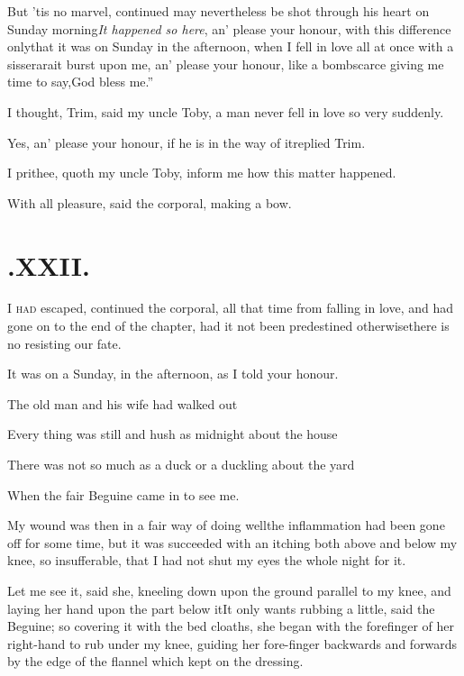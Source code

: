 \documentclass{article}
\begin{document}
\quad\tsh But ’tis no marvel, continued\break 
{}
\tsk may nevertheless be shot
through his heart on Sunday morning\tsh \textit{It
happened so here}, an’ please your honour, with this
difference only\tsk that it was on Sunday in the afternoon, when I fell in love all
at once with a sisserara\tsh it burst upon me, an’
please your honour, like a bomb\tsh scarce giving me time
to say,\break\lqq God bless me.”

I thought, Trim, said my uncle\break
Toby, a man never fell in love so very\break
suddenly.

Yes, an’ please your honour, if\break
he is in the way of it\tsh replied\break
Trim.

I prithee, quoth my uncle Toby,\break
inform me how this matter happened.

\tsh With all pleasure, said the corporal, making a
bow.

\vfill{}\eject\null
\section{.\enspace XXII.}

\lettrine{I}{ had} escaped, continued the
corporal, all that time from falling in love, and had gone on to
the end of the chapter, had it not been predestined
otherwise\tsh\break there is no resisting our fate.

It was on a Sunday, in the afternoon, as I told your
honour.

The old man and his wife had walked
out\tsh

Every thing was still and hush as midnight about the
house\tsh

There was not so much as a duck or a duckling about the
yard\tsh{}

\tsh When the fair Beguine came in to see
me.

My wound was then in a fair way of doing well\tsh the
inflammation had been gone off for some time, but it was succeeded
with an itching both above and below my knee, so insufferable, that
I had not shut my eyes the whole night for it.

Let me see it, said she, kneeling down upon the ground parallel
to my knee, and laying her hand upon the part below
it\tsh It only wants rubbing a little, said the
Beguine; so covering it with the bed cloaths, she began with
the forefinger of her right-hand to rub under my knee, guiding her
fore-finger backwards and forwards by the edge of the flannel which
kept on the dressing.
\end{document}
